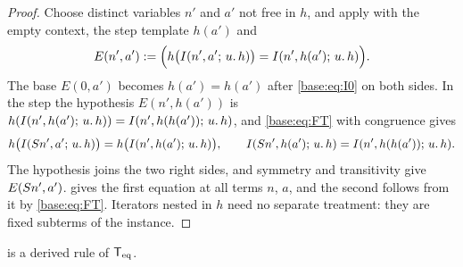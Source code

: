 \begin{proof}
Choose distinct variables $n'$ and $a'$ not free in $h$, and apply
 with the empty context, the step template $h(a')$ and
\[
 E(n',a')\mathrel{:=}\Bigl(h\bigl(I(n',a';\,u.\,h)\bigr)=I(n',h(a');\,u.\,h)\Bigr).
\]
The base $E(0,a')$ becomes $h(a')=h(a')$ after \eqref{base:eq:I0} on both
sides.  In the step the hypothesis $E(n',h(a'))$ is
$h(I(n',h(a');\,u.\,h))=I(n',h(h(a'));\,u.\,h)$, and \eqref{base:eq:FT}
with congruence gives
\[
 h\bigl(I(S n',a';\,u.\,h)\bigr)=h\bigl(I(n',h(a');\,u.\,h)\bigr),\qquad
 I(S n',h(a');\,u.\,h)=I(n',h(h(a'));\,u.\,h).
\]
The hypothesis joins the two right sides, and symmetry and transitivity give
$E(S n',a')$.   gives the first equation at all terms $n$,
$a$, and the second follows from it by \eqref{base:eq:FT}.  Iterators nested
in $h$ need no separate treatment: they are fixed subterms of the instance.
\end{proof}

\begin{lemma}
\label{base:lem:tail-teq}
 is a derived rule of $\mathsf{T}_{\mathrm{eq}}$.
\end{lemma}

